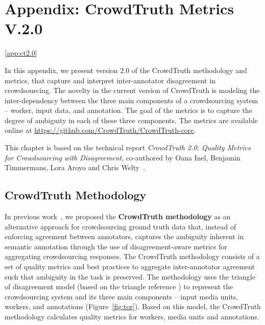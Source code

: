 
\manualmark
{}

\renewcommand{\thesection}{\Alph{section}}

\appendix

\chapter*{Appendix: CrowdTruth Metrics V.2.0}
\ref{app:ct2.0}

In this appendix, we present version 2.0 of the CrowdTruth methodology and metrics, that capture and interpret inter-annotator disagreement in crowdsourcing. The novelty in the current version of CrowdTruth is modeling the inter-dependency between the three main components of a crowdsourcing system -- worker, input data, and annotation. The goal of the metrics is to capture the degree of ambiguity in each of these three components. The metrics are available online at \url{https://github.com/CrowdTruth/CrowdTruth-core}.

This chapter is based on the technical report \textit{CrowdTruth 2.0: Quality Metrics for Crowdsourcing with Disagreement}, co-authored by Oana Inel, Benjamin Timmermans, Lora Aroyo and Chris Welty~\cite{dumitrache2018crowdtruth}.


\section{CrowdTruth Methodology}

In previous work~\cite{aroyo2015truth}, we proposed the \textbf{CrowdTruth methodology} as an alternative approach for crowdsourcing ground truth data that, instead of enforcing agreement between annotators, captures the ambiguity inherent in semantic annotation through the use of disagreement-aware metrics for aggregating crowdsourcing responses. The CrowdTruth methodology consists of a set of quality metrics and best practices to aggregate inter-annotator agreement such that ambiguity in the task is preserved. The methodology uses the triangle of disagreement model (based on the triangle reference \cite{knowlton1966definition}) to represent the crowdsourcing system and its three main components -- input media units, workers, and annotations (Figure~\ref{fig:tor}). Based on this model, the CrowdTruth methodology calculates quality metrics for workers, media units and annotations.

